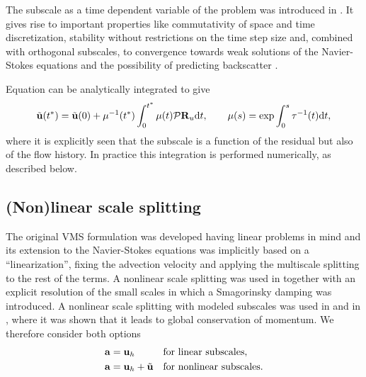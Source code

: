 The subscale as a time dependent variable of the problem was introduced in \cite{codina_stabilized_2002,codina_time_2007}. It gives rise to important properties like commutativity of space and time discretization, stability without restrictions on the time step size \cite{codina_time_2007,Badia2009a} and, combined with orthogonal subscales, to convergence towards weak solutions of the Navier-Stokes equations \cite{Badia2013Convergence} and the possibility of predicting backscatter \cite{Codina-chap-2011,Principe2009}. 

Equation  can be analytically integrated to give
\begin{equation}
\label{eq:exact_sgs}
\tilde{{\bf u}}(t^*)=\tilde{{\bf u}}(0) + \mu^{-1}(t^*) \int_0^{t^*} \mu(t) \mathcal{P}{\bf R}_u {\rm d}t, \quad \quad \mu(s)=\exp \int_0^s \tau^{-1}(t){\rm d}t,
\end{equation}
where it is explicitly seen that the subscale is a function of the residual but also of the flow history. In practice this integration is performed numerically, as described below.

\subsection{(Non)linear scale splitting}
\label{subsec-C2_vms_nl}
The original VMS formulation \cite{hughes_multiscale_1995,hughes_variational_1998} was developed having linear problems in mind and its extension to the Navier-Stokes equations was implicitly based on a ``linearization'', fixing the advection velocity and applying the multiscale splitting to the rest of the terms. A nonlinear scale splitting was used in \cite{Hughes2000,hughes_large_2001} together with an explicit resolution of the small scales in which a Smagorinsky damping was introduced. A nonlinear scale splitting with modeled subscales was used in \cite{codina_stabilized_2002, bazilevs_variational_2007} and in \cite{codina_time_2007}, where it was shown that it leads to global conservation of momentum. We therefore consider both options
\begin{align}
\label{eq-C2_vms_a_lin}
&{\bf a}={\bf u}_h&&\mbox{for linear subscales},\\
\label{eq-C2_vms_a_nl}
&{\bf a}={\bf u}_h+\tilde{{\bf u}}&&\mbox{for nonlinear subscales}.
\end{align}

